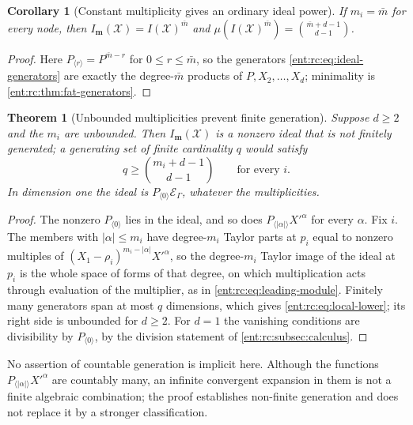 \documentclass[11pt]{article}
\newtheorem{theorem}{Theorem}[section]
\theoremstyle{plain}
\theoremstyle{plain}
\theoremstyle{plain}
\newtheorem{corollary}[corollary]{Corollary}
\theoremstyle{definition}
\theoremstyle{definition}
\theoremstyle{definition}
\theoremstyle{definition}
\theoremstyle{remark}
\newcommand{\E}{\mathcal E_\Gamma}
\begin{document}
\begin{corollary}[Constant multiplicity gives an ordinary ideal power]
\label{ent:rc:cor:powers}
If $m_i=\bar m$ for every node, then
$I_{\mathbf m}(\mathcal X)=I(\mathcal X)^{\bar m}$ and
$\mu(I(\mathcal X)^{\bar m})=\binom{\bar m+d-1}{d-1}$.
\end{corollary}
\begin{proof}
Here $P_{\langle r\rangle}=P^{\bar m-r}$ for $0\le r\le\bar m$, so the
generators \eqref{ent:rc:eq:ideal-generators} are exactly the degree-$\bar m$
products of $P,X_2,\ldots,X_d$; minimality is
\cref{ent:rc:thm:fat-generators}.
\end{proof}

\begin{theorem}[Unbounded multiplicities prevent finite generation]
\label{ent:rc:thm:unbounded}
Suppose $d\ge2$ and the $m_i$ are unbounded. Then $I_{\mathbf m}(\mathcal X)$
is a nonzero ideal that is not finitely generated; a generating set of finite
cardinality $q$ would satisfy
\begin{equation}\label{ent:rc:eq:local-lower}
 q\ge\binom{m_i+d-1}{d-1}\qquad\text{for every }i .
\end{equation}
In dimension one the ideal is $P_{\langle0\rangle}\E$, whatever the
multiplicities.
\end{theorem}
\begin{proof}
The nonzero $P_{\langle0\rangle}$ lies in the ideal, and so does
$P_{\langle|\alpha|\rangle}X'^\alpha$ for every $\alpha$. Fix $i$. The members
with $|\alpha|\le m_i$ have degree-$m_i$ Taylor parts at $p_i$ equal to nonzero
multiples of $(X_1-\rho_i)^{m_i-|\alpha|}X'^\alpha$, so the degree-$m_i$
Taylor image of the ideal at $p_i$ is the whole space of forms of that degree,
on which multiplication acts through evaluation of the multiplier, as in
\eqref{ent:rc:eq:leading-module}. Finitely many generators span at most $q$
dimensions, which gives \eqref{ent:rc:eq:local-lower}; its right side is
unbounded for $d\ge2$. For $d=1$ the vanishing conditions are divisibility by
$P_{\langle0\rangle}$, by the division statement of
\cref{ent:rc:subsec:calculus}.
\end{proof}

No assertion of countable generation is implicit here. Although the functions
$P_{\langle|\alpha|\rangle}X'^\alpha$ are countably many, an infinite convergent
expansion in them is not a finite algebraic combination; the proof establishes
non-finite generation and does not replace it by a stronger classification.
\end{document}
